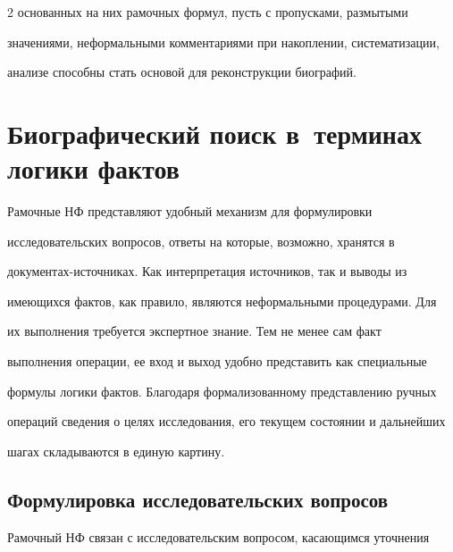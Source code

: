 \begin{multicols}{2}
основанных на них рамочных формул, пусть с пропусками, размытыми 


значениями, неформальными комментариями при накоплении, систематизации, 


анализе способны стать основой для реконструкции биографий.










\section{Биографический поиск в~терминах логики фактов}


  


  Рамочные НФ представляют удобный механизм для формулировки 


исследовательских вопросов, ответы на которые, возможно, хранятся в 


до\-ку\-мен\-тах-ис\-точ\-ни\-ках. Как интерпретация источников, так и выводы из 


имеющихся фактов, как правило, являются неформальными процедурами. Для 


их выполнения требуется экспертное знание. Тем не менее сам факт 


выполнения операции, ее вход и выход удобно представить как специальные 


формулы логики фактов. Благодаря формализованному представлению ручных 


операций сведения о целях исследования, его текущем состоянии и дальнейших 


шагах складываются в единую картину. 










\subsection{Формулировка исследовательских вопросов}


  


  Рамочный НФ связан с исследовательским вопросом, касающимся уточнения 



\end{multicols}
